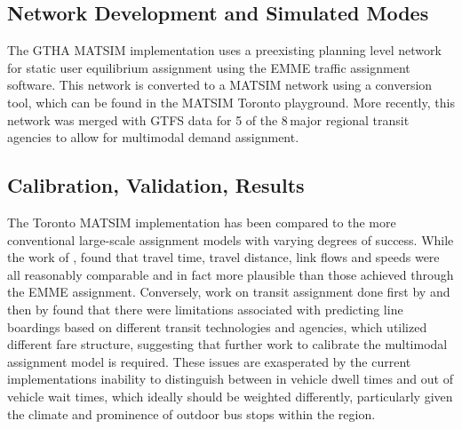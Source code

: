 \subsection{Network Development and Simulated Modes}  
The GTHA MATSIM implementation uses a preexisting planning level network for static user equilibrium assignment using the EMME traffic assignment software. This network is converted to a MATSIM network using a conversion tool, which can be found in the MATSIM Toronto playground. More recently, this network was merged with GTFS data for 5 of the 8\,major regional transit agencies to allow for multimodal demand assignment.  

\subsection{Calibration, Validation, Results}
The Toronto MATSIM implementation has been compared to the more conventional large-scale assignment models with varying degrees of success. While the work of \citet[][]{GaoWEtAl_TRR_2010}, found that travel time, travel distance, link flows and speeds were all reasonably comparable and in fact more plausible than those achieved through the EMME assignment. Conversely, work on transit assignment done first by \citet[][]{Kucirek_MastersThesis_2012} and then by \citet[][]{WeissEtAl_CJCE_2012} found that there were limitations associated with predicting line boardings based on different transit technologies and agencies, which utilized different fare structure, suggesting that further work to calibrate the multimodal assignment model is required. These issues are exasperated by the current implementations inability to distinguish between in vehicle dwell times and out of vehicle wait times, which ideally should be weighted differently, particularly given the climate and prominence of outdoor bus stops within the region. 


